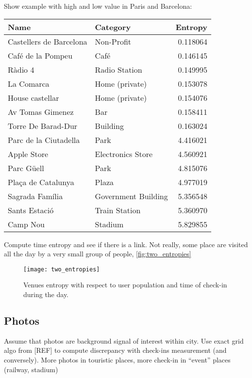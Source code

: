 Show example with high and low value in Paris and Barcelona:
\begin{tabular}{llr}
	\toprule
	Name                    & Category            & Entropy \\
	\midrule
	Castellers de Barcelona & Non-Profit          & 0.118064 \\
	Café de la Pompeu       & Café                & 0.146145 \\
	Ràdio 4                 & Radio Station       & 0.149995 \\
	La Comarca              & Home (private)      & 0.153078 \\
	House castellar         & Home (private)      & 0.154076 \\
	Av Tomas Gimenez        & Bar                 & 0.158411 \\
	Torre De Barad-Dur      & Building            & 0.163024 \\
	\midrule
	Parc de la Ciutadella   & Park                & 4.416021 \\
	Apple Store             & Electronics Store   & 4.560921 \\
	Parc Güell              & Park                & 4.815076 \\
	Plaça de Catalunya      & Plaza               & 4.977019 \\
	Sagrada Família         & Government Building & 5.356548 \\
	Sants Estació           & Train Station       & 5.360970 \\
	Camp Nou                & Stadium             & 5.829855 \\
	\bottomrule
\end{tabular}

Compute time entropy and see if there is a link. Not really, some place are
visited all the day by a very small group of people,
\autoref{fig:two_entropies}

\begin{figure}[hbtp]
\texttt{[image: two\_entropies]}
\caption{Venues entropy with respect to user population and time of check-in
during the day. \label{fig:two_entropies}}
\end{figure}


\subsection{Photos}

Assume that photos are background signal of interest within city. Use exact
grid algo from [REF] to compute discrepancy with check-ins measurement (and
conversely).  More photos in touristic places,
more check-in in “event” places (railway, stadium)

